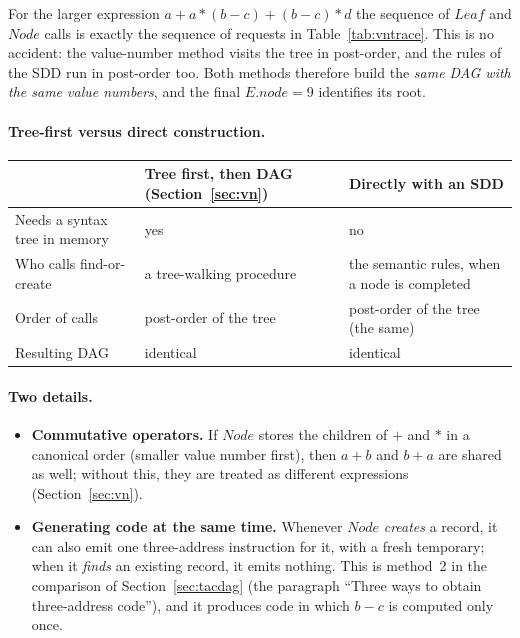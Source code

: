 \documentclass[11pt,a4paper]{article}
\newcommand{\at}[2]{\ensuremath{#1.\mathit{#2}}}
\begin{document}
For the larger expression $a + a*(b-c) + (b-c)*d$ the sequence of $\mathit{Leaf}$ and $\mathit{Node}$ calls is exactly the sequence of requests in Table~\ref{tab:vntrace}. This is no accident: the value-number method visits the tree in post-order, and the rules of the SDD run in post-order too. Both methods therefore build the \emph{same DAG with the same value numbers}, and the final $\at{E}{node}=9$ identifies its root.

\paragraph{Tree-first versus direct construction.}
\begin{center}
\small
\begin{tabular}{@{}L{3.0cm} L{5.6cm} L{5.6cm}@{}}
\toprule
 & \textbf{Tree first, then DAG} (Section~\ref{sec:vn}) & \textbf{Directly with an SDD} \\ \midrule
Needs a syntax tree in memory & yes & no \\
Who calls find-or-create & a tree-walking procedure & the semantic rules, when a node is completed \\
Order of calls & post-order of the tree & post-order of the tree (the same) \\
Resulting DAG & identical & identical \\ \bottomrule
\end{tabular}
\end{center}

\paragraph{Two details.}
\begin{itemize}[nosep]
\item \textbf{Commutative operators.} If $\mathit{Node}$ stores the children of $+$ and $*$ in a canonical order (smaller value number first), then $a+b$ and $b+a$ are shared as well; without this, they are treated as different expressions (Section~\ref{sec:vn}).
\item \textbf{Generating code at the same time.} Whenever $\mathit{Node}$ \emph{creates} a record, it can also emit one three-address instruction for it, with a fresh temporary; when it \emph{finds} an existing record, it emits nothing. This is method~2 in the comparison of Section~\ref{sec:tacdag} (the paragraph ``Three ways to obtain three-address code''), and it produces code in which $b-c$ is computed only once.
\end{itemize}
\end{document}
